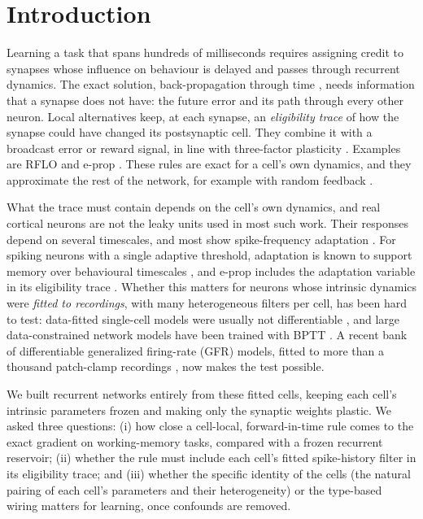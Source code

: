 \section{Introduction}

Learning a task that spans hundreds of milliseconds requires assigning credit to synapses whose
influence on behaviour is delayed and passes through recurrent dynamics. The exact solution,
back-propagation through time \citep[BPTT;][]{werbos1990bptt}, needs information that a synapse
does not have: the future error and its path through every other neuron. Local alternatives keep,
at each synapse, an \emph{eligibility trace} of how the synapse could have changed its
postsynaptic cell. They combine it with a broadcast error or reward signal, in line with
three-factor plasticity \citep{gerstner2018}. Examples are RFLO \citep{murray2019rflo} and e-prop
\citep{bellec2020eprop} \citep[see also][]{williams1989rtrl,marschall2020}. These rules are exact
for a cell's own dynamics, and they approximate the rest of the network, for example with random
feedback \citep{lillicrap2016fa}.

What the trace must contain depends on the cell's own dynamics, and real cortical neurons are not
the leaky units used in most such work. Their responses depend on several timescales, and most
show spike-frequency adaptation \citep{benda2003}. For spiking neurons with a single adaptive
threshold, adaptation is known to support memory over behavioural timescales
\citep{bellec2018lsnn,salaj2021sfa}, and e-prop includes the adaptation variable in its
eligibility trace \citep{bellec2020eprop}. Whether this matters for neurons whose intrinsic
dynamics were \emph{fitted to recordings}, with many heterogeneous filters per cell, has been hard
to test: data-fitted single-cell models were usually not differentiable \citep{teeter2018glif}, and
large data-constrained network models have been trained with BPTT
\citep{billeh2020,chen2022v1}. A recent bank of differentiable generalized firing-rate (GFR)
models, fitted to more than a thousand patch-clamp recordings \citep{yeung2025gfr}, now makes the
test possible.

We built recurrent networks entirely from these fitted cells, keeping each cell's intrinsic
parameters frozen and making only the synaptic weights plastic. We asked three questions:
(i) how close a cell-local, forward-in-time rule comes to the exact gradient on working-memory
tasks, compared with a frozen recurrent reservoir; (ii) whether the rule must include each cell's
fitted spike-history filter in its eligibility trace; and (iii) whether the specific identity of
the cells (the natural pairing of each cell's parameters and their heterogeneity) or the type-based
wiring matters for learning, once confounds are removed.

